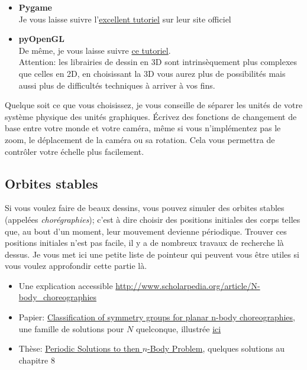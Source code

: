 \documentclass{article}
\begin{document}
\begin{itemize}
    \item \textbf{Pygame}\\
    Je vous laisse suivre l'\href{https://www.pygame.org/docs/}{excellent tutoriel} sur leur site officiel
    \item \textbf{pyOpenGL}\\
    De même, je vous laisse suivre \href{http://pyopengl.sourceforge.net/context/tutorials/index.html}{ce tutoriel}.\\
    Attention: les librairies de dessin en 3D sont intrinsèquement plus complexes que celles en 2D, en choisissant la 3D vous aurez plus de possibilités mais aussi plus de difficultés techniques à arriver à vos fins.
\end{itemize}

Quelque soit ce que vous choisissez, je vous conseille de séparer les unités de votre système physique des unités graphiques. Écrivez des fonctions de changement de base entre votre monde et votre caméra, même si vous n'implémentez pas le zoom, le déplacement de la caméra ou sa rotation. Cela vous permettra de contrôler votre échelle plus facilement.

\subsection{Orbites stables}
\label{solstables}

Si vous voulez faire de beaux dessins, vous pouvez simuler des orbites stables (appelées \emph{chorégraphies}); c'est à dire choisir des positions initiales des corps telles que, au bout d'un moment, leur mouvement devienne périodique. Trouver ces positions initiales n'est pas facile, il y a de nombreux travaux de recherche là dessus. Je vous met ici une petite liste de pointeur qui peuvent vous être utiles si vous voulez approfondir cette partie là.

\begin{itemize}
    \item Une explication accessible \url{http://www.scholarpedia.org/article/N-body_choreographies}
    \item Papier: \href{http://eprints.maths.manchester.ac.uk/2063/1/choreographies.pdf}{Classification of symmetry groups for planar n-body choreographies}, une famille de solutions pour $N$ quelconque, illustrée \href{http://rectangleworld.com/demos/nBody/}{ici}
    \item Thèse: \href{http://www.combinatorialmath.ca/Students/DyckThesis.pdf}{Periodic Solutions to then $n$-Body Problem}, quelques solutions au chapitre 8
\end{itemize}
\end{document}
